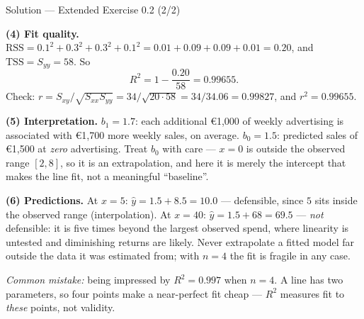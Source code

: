 \documentclass[aspectratio=169,11pt]{beamer}
\begin{document}
\begin{frame}{Solution --- Extended Exercise 0.2 (2/2)}
  \begin{solutionbox}
    \textbf{(4) Fit quality.}
    $\mathrm{RSS} = 0.1^2+0.3^2+0.3^2+0.1^2 = 0.01+0.09+0.09+0.01 = 0.20$,
    and $\mathrm{TSS} = S_{yy} = 58$. So
    \[
      R^2 = 1 - \frac{0.20}{58} = 0.99655 .
    \]
    Check: $r = S_{xy}/\sqrt{S_{xx}S_{yy}} = 34/\sqrt{20 \cdot 58}
    = 34/34.06 = 0.99827$, and $r^2 = 0.99655$. \checkmark

    \textbf{(5) Interpretation.} $b_1 = 1.7$: each additional
    \euro 1{,}000 of weekly advertising is associated with \euro 1{,}700 more
    weekly sales, on average. $b_0 = 1.5$: predicted sales of \euro 1{,}500
    at \emph{zero} advertising. Treat $b_0$ with care --- $x = 0$ is outside
    the observed range $[2,8]$, so it is an extrapolation, and here it is
    merely the intercept that makes the line fit, not a meaningful
    ``baseline''.

    \textbf{(6) Predictions.} At $x = 5$: $\hat y = 1.5 + 8.5 = 10.0$ ---
    defensible, since $5$ sits inside the observed range (interpolation). At
    $x = 40$: $\hat y = 1.5 + 68 = 69.5$ --- \emph{not} defensible: it is
    five times beyond the largest observed spend, where linearity is
    untested and diminishing returns are likely. Never extrapolate a fitted
    model far outside the data it was estimated from; with $n = 4$ the fit
    is fragile in any case.

    \smallskip
    \textit{Common mistake:} being impressed by $R^2 = 0.997$ when $n = 4$.
    A line has two parameters, so four points make a near-perfect fit cheap
    --- $R^2$ measures fit to \emph{these} points, not validity.
  \end{solutionbox}
\end{frame}
\end{document}
